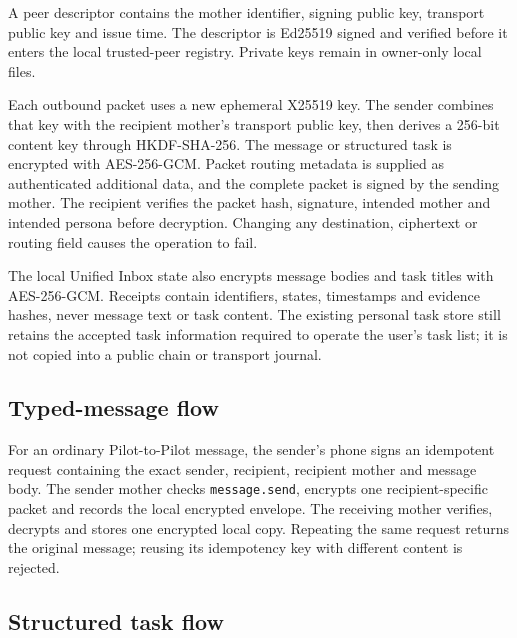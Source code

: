 A peer descriptor contains the mother identifier, signing public key, transport public key and
issue time.  The descriptor is Ed25519 signed and verified before it enters the local trusted-peer
registry.  Private keys remain in owner-only local files.

Each outbound packet uses a new ephemeral X25519 key.  The sender combines that key with the
recipient mother's transport public key, then derives a 256-bit content key through HKDF-SHA-256.
The message or structured task is encrypted with AES-256-GCM.  Packet routing metadata is supplied
as authenticated additional data, and the complete packet is signed by the sending mother.  The
recipient verifies the packet hash, signature, intended mother and intended persona before
decryption.  Changing any destination, ciphertext or routing field causes the operation to fail.

The local Unified Inbox state also encrypts message bodies and task titles with AES-256-GCM.
Receipts contain identifiers, states, timestamps and evidence hashes, never message text or task
content.  The existing personal task store still retains the accepted task information required
to operate the user's task list; it is not copied into a public chain or transport journal.

\subsection{Typed-message flow}

For an ordinary Pilot-to-Pilot message, the sender's phone signs an idempotent request containing
the exact sender, recipient, recipient mother and message body.  The sender mother checks
\texttt{message.send}, encrypts one recipient-specific packet and records the local encrypted
envelope.  The receiving mother verifies, decrypts and stores one encrypted local copy.  Repeating
the same request returns the original message; reusing its idempotency key with different content
is rejected.

\subsection{Structured task flow}

